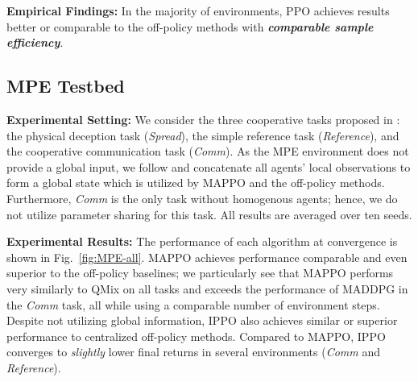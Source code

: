 \documentclass{article}
\theoremstyle{plain}
\theoremstyle{definition}
\theoremstyle{remark}
\begin{document}
\textbf{Empirical Findings:} In the majority of environments, PPO achieves results better or comparable to the off-policy methods with \textbf{\emph{comparable sample efficiency}}. 




\subsection{MPE Testbed}
\textbf{Experimental Setting:} We consider the three cooperative tasks proposed in \cite{lowe2017multi}: the physical deception task (\emph{Spread}), the simple reference task (\emph{Reference}), and the cooperative communication task (\emph{Comm}). As the MPE environment does not provide a global input, we follow \cite{lowe2017multi} and concatenate all agents' local observations to form a global state which is utilized by MAPPO and the off-policy methods. Furthermore, \emph{Comm} is the only task without homogenous agents; hence, we do not utilize parameter sharing for this task. All results are averaged over ten seeds.

\textbf{Experimental Results:} The performance of each algorithm at convergence is shown in Fig.~\ref{fig:MPE-all}. MAPPO achieves performance comparable and even superior to the off-policy baselines; we particularly see that MAPPO performs very similarly to QMix on all tasks and exceeds the performance of MADDPG in the \emph{Comm} task, all while using a comparable number of environment steps. Despite not utilizing global information, IPPO also achieves similar or superior performance to centralized off-policy methods. Compared to MAPPO, IPPO converges to \emph{slightly} lower final returns in several environments (\emph{Comm} and \emph{Reference}). 

\end{document}
